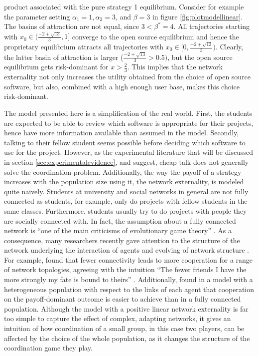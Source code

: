 product associated with the pure strategy 1 equilibrium. Consider for example 
the parameter setting $\alpha_1 =1, \alpha_2=3$, and $\beta=3$ in figure 
\ref{fig:plotmodellinear}. 
The basins of attraction are not equal, since $3<\beta^*= 4$. 
All trajectories starting with 
$x_0 \in (\frac{-2+\sqrt{13}}{3},1]$ converge to the open source equilibrium
and hence the proprietary equilibrium attracts
all trajectories with $x_0 \in [0,\frac{-2+\sqrt{13}}{3})$. 
Clearly, the latter basin of 
attraction is larger ($\frac{-2+\sqrt{13}}{3}>0.5)$, 
but the open source equilibrium gets risk-dominant for
$x>\frac 23$. This implies that the network externality not only increases the
utility obtained from the choice of open source software, but also,
combined with a high enough user base, makes this choice risk-dominant. 

The model presented here is a simplification of the real world. 
First, the students are expected to be able to review which software is 
appropriate for their projects, hence have more information available than 
assumed in the model. Secondly, talking to their fellow student seems
possible before deciding which software to use for the project. 
However, as the experimental literature that will be discussed in section 
\ref{sec:experimentalevidence}, and \textcite{aumann_nash_1990} suggest, 
cheap talk does not generally solve the coordination problem. 
Additionally, the way the payoff of a strategy increases with
the population size using it, the network externality, 
is modeled quite naively.
Students at university and social networks in general are not fully
connected as students, for example, only do projects with fellow students
in the same classes. Furthermore, students usually try to do projects
with people they are socially connected with. In fact, the assumption about
a fully connected network is ``one of the main criticisms of evolutionary game
theory'' \parencite[246]{hanauske_evolutionare_2011}. 
As a consequence, many researchers recently gave attention to the 
structure of the network underlying the interaction of agents and 
evolving of network structure \parencite[46]{szabo_evolutionary_2007}.
For example, \textcite{ohtsuki_simple_2006} found 
that fewer connectivity 
leads to more cooperation for a range of network topologies,
agreeing with the intuition
``The fewer friends I have the more strongly my fate is bound to theirs'' 
\parencite[1]{ohtsuki_simple_2006}.
Additionally, \textcite{santos_evolutionary_2006} found in a model with
a heterogeneous population with respect to the links of each agent that 
cooperation on the payoff-dominant outcome is easier to achieve than
in a fully connected population.
Although the model with a positive linear network externality is far too 
simple to capture the effect of complex, adapting networks, it gives an 
intuition of how coordination of a small group, in this case two players, 
can be affected by the choice of the whole population, as it changes
the structure of the coordination game they play.
